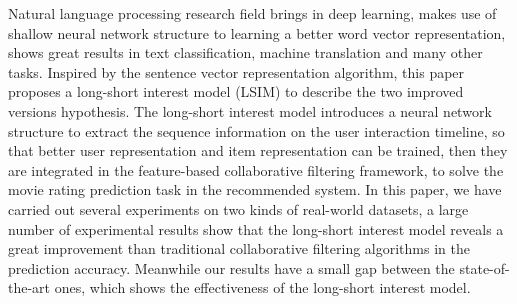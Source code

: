 \begin{eabstract}
Natural language processing research field brings in deep learning,
makes use of shallow neural network structure to learning a better word vector representation,
shows great results in text classification, machine translation and many other tasks.
Inspired by the sentence vector representation algorithm,
this paper proposes a long-short interest model (LSIM) to describe the two improved versions hypothesis.
The long-short interest model introduces a neural network structure to extract the sequence information
on the user interaction timeline,
so that better user representation and item representation can be trained,
then they are integrated in the feature-based collaborative filtering framework,
to solve the movie rating prediction task in the recommended system.
In this paper, we have carried out several experiments on two kinds of real-world datasets,
a large number of experimental results show that the long-short interest model reveals
a great improvement than traditional collaborative filtering algorithms in the prediction accuracy.
Meanwhile our results have a small gap between the state-of-the-art ones,
which shows the effectiveness of the long-short interest model.
\end{eabstract}


